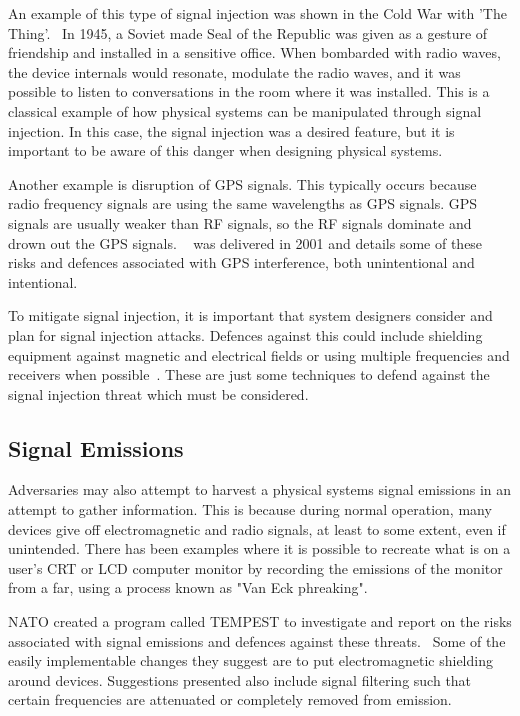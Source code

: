 An example of this type of signal injection was shown in the Cold War with 'The Thing'.~\cite{thing} In 1945, a Soviet made Seal of the 
Republic was given as a gesture of friendship and installed in a sensitive office. When bombarded with radio waves, the device internals
would resonate, modulate the radio waves, and it was possible to listen to conversations in the room where it was installed. This is a
classical example of how physical systems can be manipulated through signal injection. In this case, the signal injection was a desired
feature, but it is important to be aware of this danger when designing physical systems.

Another example is disruption of GPS signals. This typically occurs because radio frequency signals are using the same wavelengths as
GPS signals. GPS signals are usually weaker than RF signals, so the RF signals dominate and drown out the GPS signals. ~\cite{gpsdisruption} 
was delivered in 2001 and details some of these risks and defences associated with GPS interference, both unintentional and intentional.

To mitigate signal injection, it is important that system designers consider and plan for signal injection attacks. Defences against this could
include shielding equipment against magnetic and electrical fields or using multiple frequencies and receivers when possible~\cite{gpsdisruption}.
These are just some techniques to defend against the signal injection threat which must be considered.

\subsection{Signal Emissions}
Adversaries may also attempt to harvest a physical systems signal emissions in an attempt to gather information. This is because during
normal operation, many devices give off electromagnetic and radio signals, at least to some extent, even if unintended. There has been
examples where it is possible to recreate what is on a user's CRT or LCD computer monitor by recording the emissions of the monitor
from a far, using a process known as "Van Eck phreaking".~\cite{monitor}~\cite{lcds}

NATO created a program called TEMPEST to investigate and report on the risks associated with signal emissions and defences
against these threats.~\cite{tempest} Some of the easily implementable changes they suggest are to put electromagnetic shielding
around devices. Suggestions presented also include signal filtering such that certain frequencies are attenuated or completely removed
from emission.

